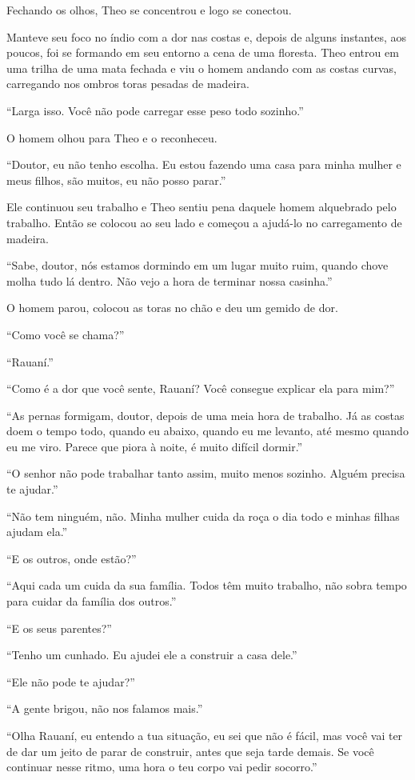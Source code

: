 Fechando os olhos, Theo se concentrou e logo se conectou.

Manteve seu foco no índio com a dor nas costas e, depois de alguns
instantes, aos poucos, foi se formando em seu entorno a cena de uma
floresta. Theo entrou em uma trilha de uma mata fechada e viu o homem
andando com as costas curvas, carregando nos ombros toras pesadas de
madeira.

``Larga isso. Você não pode carregar esse peso todo sozinho.''

O homem olhou para Theo e o reconheceu.

``Doutor, eu não tenho escolha. Eu estou fazendo uma casa para minha
mulher e meus filhos, são muitos, eu não posso parar.''

Ele continuou seu trabalho e Theo sentiu pena daquele homem alquebrado
pelo trabalho. Então se colocou ao seu lado e começou a ajudá-lo no
carregamento de madeira.

``Sabe, doutor, nós estamos dormindo em um lugar muito ruim, quando
chove molha tudo lá dentro. Não vejo a hora de terminar nossa casinha.''

O homem parou, colocou as toras no chão e deu um gemido de dor.

``Como você se chama?''

``Rauaní.''

``Como é a dor que você sente, Rauaní? Você consegue explicar ela para
mim?''

``As pernas formigam, doutor, depois de uma meia hora de trabalho. Já as
costas doem o tempo todo, quando eu abaixo, quando eu me levanto, até
mesmo quando eu me viro. Parece que piora à noite, é muito difícil
dormir.''

``O senhor não pode trabalhar tanto assim, muito menos sozinho. Alguém
precisa te ajudar.''

``Não tem ninguém, não. Minha mulher cuida da roça o dia todo e minhas
filhas ajudam ela.''

``E os outros, onde estão?''

``Aqui cada um cuida da sua família. Todos têm muito trabalho, não sobra
tempo para cuidar da família dos outros.''

``E os seus parentes?''

``Tenho um cunhado. Eu ajudei ele a construir a casa dele.''

``Ele não pode te ajudar?''

``A gente brigou, não nos falamos mais.''

``Olha Rauaní, eu entendo a tua situação, eu sei que não é fácil, mas
você vai ter de dar um jeito de parar de construir, antes que seja tarde
demais. Se você continuar nesse ritmo, uma hora o teu corpo vai pedir
socorro.''

